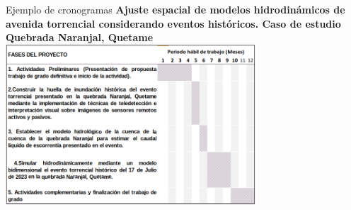 \documentclass[
10pt,
aspectratio=169,
]{beamer}
\begin{document}
\begin{frame}{Ejemplo de cronogramas}
\textbf{Ajuste espacial de modelos hidrodinámicos de avenida torrencial considerando eventos históricos. Caso de estudio Quebrada Naranjal, Quetame} 
\centering
\includegraphics[width=0.7\textwidth]{f1prog.png}
\end{frame}
\end{document}
